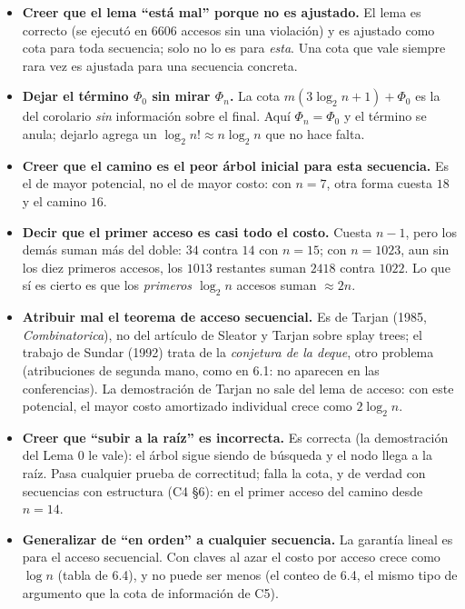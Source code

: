 \documentclass[11pt]{article}
\begin{document}
\begin{alertarota}
\begin{itemize}[leftmargin=14pt]
\item \textbf{Creer que el lema ``está mal'' porque no es ajustado.} El lema es correcto (se ejecutó en 6606 accesos sin una violación) y es ajustado como cota para toda secuencia; solo no lo es
para \emph{esta}. Una cota que vale siempre rara vez es ajustada para una secuencia concreta.
\item \textbf{Dejar el término $\Phi_0$ sin mirar $\Phi_n$.} La cota $m(3\log_2n+1)+\Phi_0$ es la del corolario \emph{sin} información sobre el final. Aquí $\Phi_n=\Phi_0$ y el término se anula; dejarlo
agrega un $\log_2n!\approx n\log_2n$ que no hace falta.
\item \textbf{Creer que el camino es el peor árbol inicial para esta secuencia.} Es el de mayor potencial, no el de mayor costo: con $n=7$, otra forma cuesta $18$ y el camino $16$.
\item \textbf{Decir que el primer acceso es casi todo el costo.} Cuesta $n-1$, pero los demás suman más del doble: $34$ contra $14$ con $n=15$; con $n=1023$, aun sin los diez primeros accesos, los $1013$ restantes suman $2418$ contra $1022$. Lo que sí es cierto
es que los \emph{primeros $\log_2n$} accesos suman $\approx2n$.
\item \textbf{Atribuir mal el teorema de acceso secuencial.} Es de Tarjan (1985, \emph{Combinatorica}), no del artículo de Sleator y Tarjan sobre splay trees; el trabajo de Sundar (1992) trata de la
\emph{conjetura de la deque}, otro problema (atribuciones de segunda mano, como en 6.1: no aparecen en las conferencias). La demostración de Tarjan no sale del lema de acceso: con este potencial, el mayor costo amortizado individual crece como $2\log_2n$.
\item \textbf{Creer que ``subir a la raíz'' es incorrecta.} Es correcta (la demostración del Lema 0 le vale): el árbol sigue siendo de búsqueda y el nodo llega a la raíz. Pasa cualquier prueba de correctitud;
falla la cota, y de verdad con secuencias con estructura (C4 §6): en el primer acceso del camino desde $n=14$.
\item \textbf{Generalizar de ``en orden'' a cualquier secuencia.} La garantía lineal es para el acceso secuencial. Con claves al azar el costo por acceso crece como $\log n$ (tabla de 6.4),
y no puede ser menos (el conteo de 6.4, el mismo tipo de argumento que la cota de información de C5).
\end{itemize}
\end{alertarota}
\end{document}

